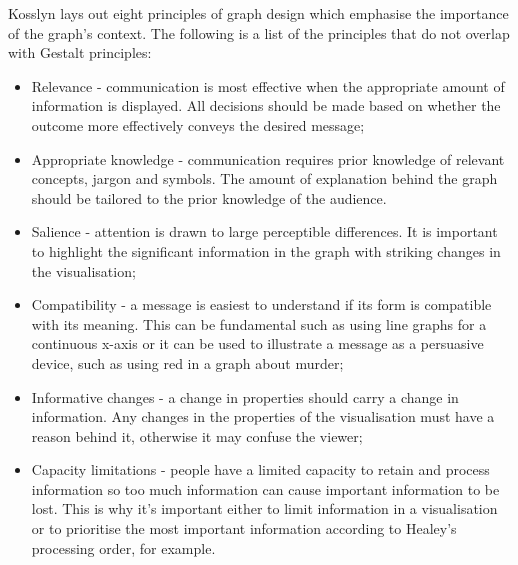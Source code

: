 			Kosslyn lays out eight principles of graph design which emphasise the importance of the graph's context\cite{graph_mind_kosslyn}. The following is a list of the principles that do not overlap with Gestalt principles:
			\begin{itemize}
				\item Relevance - communication is most effective when the appropriate amount of information is displayed. All decisions should be made based on whether the outcome more effectively conveys the desired message;
				\item Appropriate knowledge - communication requires prior knowledge of relevant concepts, jargon and symbols. The amount of explanation behind the graph should be tailored to the prior knowledge of the audience.
				\item Salience - attention is drawn to large perceptible differences. It is important to highlight the significant information in the graph with striking changes in the visualisation;
				\item Compatibility - a message is easiest to understand if its form is compatible with its meaning. This can be fundamental such as using line graphs for a continuous x-axis or it can be used to illustrate a message as a persuasive device, such as using red in a graph about murder;
				\item Informative changes - a change in properties should carry a change in information. Any changes in the properties of the visualisation must have a reason behind it, otherwise it may confuse the viewer;
				\item Capacity limitations - people have a limited capacity to retain and process information so too much information can cause important information to be lost. This is why it's important either to limit information in a visualisation or to prioritise the most important information according to Healey's processing order, for example.
			\end{itemize}
